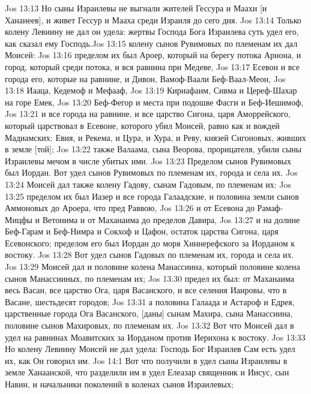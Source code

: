 \vs Jos 13:13 Но сыны Израилевы не выгнали жителей Гессура и Маахи [и Хананеев], и живет Гессур и Мааха среди Израиля до сего дня.
\vs Jos 13:14 Только колену Левиину не дал он удела: жертвы Господа Бога Израилева суть удел его, как сказал ему Господь.
\vs Jos 13:15 колену сынов Рувимовых по племенам их дал  Моисей:
\vs Jos 13:16 пределом их был Ароер, который на берегу потока Арнона, и город, который среди потока, и вся равнина при Медеве,
\vs Jos 13:17 Есевон и все города его, которые на равнине, и Дивон, Вамоф-Ваали Беф-Ваал-Меон,
\vs Jos 13:18 Иааца, Кедемоф и Мефааф,
\vs Jos 13:19 Кириафаим, Сивма и Цереф-Шахар на горе Емек,
\vs Jos 13:20 Беф-Фегор и места при подошве Фасги и Беф-Иешимоф,
\vs Jos 13:21 и все города на равнине, и все царство Сигона, царя Аморрейского, который царствовал в Есевоне, которого убил Моисей, равно как и вождей Мадиамских: Евия, и Рекема, и Цура, и Хура, и Реву, князей Сигоновых, живших в земле [той];
\vs Jos 13:22 также Валаама, сына Веорова, прорицателя, убили сыны Израилевы мечом в числе убитых ими.
\vs Jos 13:23 Пределом сынов Рувимовых был Иордан. Вот удел сынов Рувимовых по племенам их, города и села их.
\vs Jos 13:24 Моисей дал также  колену Гадову, сынам Гадовым, по племенам их:
\vs Jos 13:25 пределом их был Иазер и все города Галаадские, и половина земли сынов Аммоновых до Ароера, что пред Раввою,
\vs Jos 13:26 и  от Есевона до Рамаф-Мицфы и Ветонима и от Маханаима до пределов Давира,
\vs Jos 13:27 и на долине Беф-Гарам и Беф-Нимра и Сокхоф и Цафон, остаток царства Сигона, царя Есевонского; пределом его был Иордан до моря Хиннерефского за Иорданом к востоку.
\vs Jos 13:28 Вот удел сынов Гадовых по племенам их, города и села их.
\vs Jos 13:29 Моисей дал  и половине колена Манассиина, который  половине колена сынов Манассииных, по племенам их;
\vs Jos 13:30 предел их был: от Маханаима весь Васан, все царство Ога, царя Васанского, и все селения Иаировы, что в Васане, шестьдесят городов;
\vs Jos 13:31 а половина Галаада и Астароф и Едрея, царственные города Ога Васанского, [даны] сынам Махира, сына Манассиина, половине сынов Махировых, по племенам их.
\vs Jos 13:32 Вот что Моисей дал в удел на равнинах Моавитских за Иорданом против Иерихона к востоку.
\vs Jos 13:33 Но колену Левиину Моисей не дал удела: Господь Бог Израилев Сам есть удел их, как Он говорил им.
\vs Jos 14:1 Вот что получили в удел сыны Израилевы в земле Ханаанской, что разделили им в удел Елеазар священник и Иисус, сын Навин, и начальники поколений в коленах сынов Израилевых;
